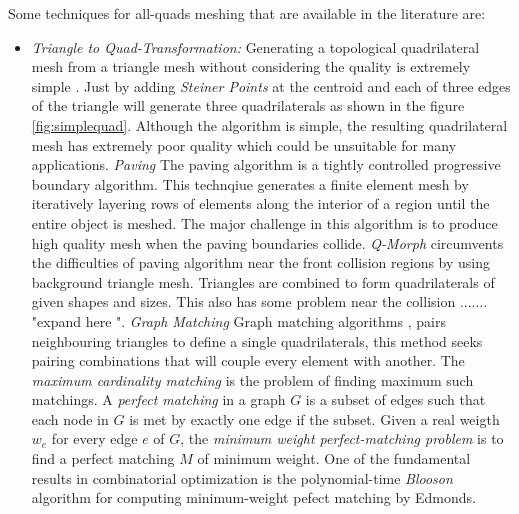 \documentclass[11pt, a4paper]{paper}
\begin{document}
Some techniques for all-quads meshing that are available in the literature
are:

\begin{itemize}
\item {\em Triangle to Quad-Transformation:}
Generating a topological quadrilateral mesh from a triangle mesh 
without considering the quality is extremely simple \cite{suneeta}. Just by 
adding {\em Steiner Points } at the centroid and each of three edges of the triangle
will generate three quadrilaterals as shown in the figure
\ref{fig:simplequad}. Although the algorithm is simple, the resulting
quadrilateral mesh has extremely poor quality which could be unsuitable for many
applications.
{\em Paving} The paving algorithm \cite{cass,ted} is a tightly controlled
progressive boundary algorithm. This technqiue generates a finite element mesh
by iteratively layering rows of elements along the interior of a region until
the entire object is meshed. The major challenge in this algorithm is to
produce high quality mesh when the paving boundaries collide.  
{\em Q-Morph} circumvents the difficulties of paving algorithm near the front
collision regions by using background triangle mesh. Triangles are combined to
form quadrilaterals of given shapes and sizes. This also has some problem near
the collision ....... "expand here ".
{\em Graph Matching}
Graph matching algorithms \cite{edmonds}, \cite{suneeta} pairs neighbouring
triangles to define a single quadrilaterals, this method seeks pairing
combinations that will couple every element with another. The {\em maximum
cardinality matching} is the problem of finding maximum such matchings. A {\em
perfect matching } in a graph $G$ is a subset of edges such that each node
in $G$ is met by exactly one edge if the subset. Given a real weigth $w_e$ for
every edge $e$ of $G$, the {\em minimum weight perfect-matching problem} is to
find a perfect matching $M$ of minimum weight. One of the fundamental results
in combinatorial optimization is the polynomial-time {\em Blooson} algorithm
for computing minimum-weight pefect matching by Edmonds. 


\end{itemize}
\end{document}
